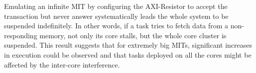     Emulating an infinite MIT by configuring the AXI-Resistor to accept the transaction but never answer systematically leads the whole system to be suspended indefinitely.
    In other words, if a task tries to fetch data from a non-responding memory, not only its core stalls, but the whole core cluster is suspended.
    This result suggests that for extremely big MITs, significant increases in execution could be observed and that tasks deployed on all the cores might be affected by the inter-core interference.
